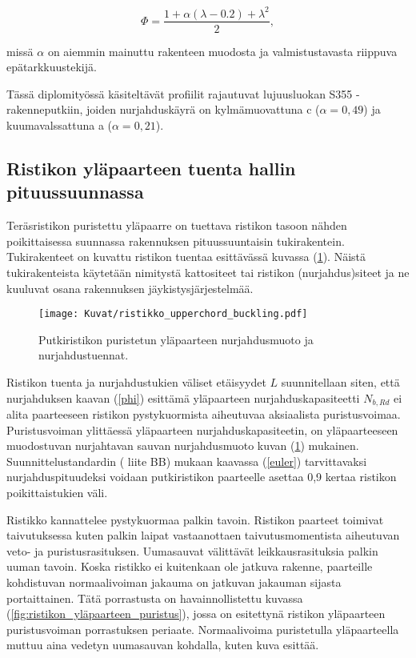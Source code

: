 \documentclass[12pt]{article}
\newenvironment{content}{\pagenumbering{arabic}}{}
\begin{document}
\begin{content}
\begin{equation}
\label{phi}
\Phi = \frac{1+\alpha (\lambda-0.2)+\lambda^2}{2},
\end{equation}   

missä $\alpha$ on aiemmin mainuttu rakenteen muodosta ja valmistustavasta riippuva epätarkkuustekijä. 

Tässä diplomityössä käsiteltävät profiilit rajautuvat lujuusluokan S355 -rakenneputkiin, joiden nurjahduskäyrä on kylmämuovattuna c ($\alpha = 0,49$) ja kuumavalssattuna a ($\alpha = 0,21$).  



\subsection{Ristikon yläpaarteen tuenta hallin pituussuunnassa}

Teräsristikon puristettu yläpaarre on tuettava ristikon tasoon nähden poikittaisessa suunnassa rakennuksen pituussuuntaisin tukirakentein. Tukirakenteet on kuvattu ristikon tuentaa esittävässä kuvassa (\ref{fig:ristikon_nurjahdus}). Näistä tukirakenteista käytetään nimitystä kattositeet tai ristikon (nurjahdus)siteet ja ne kuuluvat osana rakennuksen jäykistysjärjestelmää.  \parencite{try_kaitila}
 
\begin{figure}[htb]

\texttt{[image: Kuvat/ristikko\_upperchord\_buckling.pdf]}
\caption{Putkiristikon puristetun yläpaarteen nurjahdusmuoto ja nurjahdustuennat.}
\label{fig:ristikon_nurjahdus}
\end{figure}

Ristikon tuenta ja nurjahdustukien väliset etäisyydet $L$ suunnitellaan siten, että nurjahduksen kaavan (\ref{phi}) esittämä yläpaarteen nurjahduskapasiteetti $N_{b,Rd}$ ei alita paarteeseen ristikon pystykuormista aiheutuvaa aksiaalista puristusvoimaa. Puristusvoiman ylittäessä yläpaarteen nurjahduskapasiteetin, on yläpaarteeseen muodostuvan nurjahtavan sauvan nurjahdusmuoto kuvan (\ref{fig:ristikon_nurjahdus}) mukainen. Suunnittelustandardin (\citeauthor{en1993} liite BB) mukaan kaavassa (\ref{euler}) tarvittavaksi nurjahduspituudeksi voidaan putkiristikon paarteelle asettaa 0,9 kertaa ristikon poikittaistukien väli.

Ristikko kannattelee pystykuormaa palkin tavoin. Ristikon paarteet toimivat taivutuksessa kuten palkin laipat vastaanottaen taivutusmomentista aiheutuvan veto- ja puristusrasituksen. Uumasauvat välittävät leikkausrasituksia palkin uuman tavoin. Koska ristikko ei kuitenkaan ole jatkuva rakenne, paarteille kohdistuvan normaalivoiman jakauma on jatkuvan jakauman sijasta portaittainen. Tätä porrastusta on havainnollistettu kuvassa (\ref{fig:ristikon_yläpaarteen_puristus}), jossa on esitettynä ristikon yläpaarteen puristusvoiman porrastuksen periaate. Normaalivoima puristetulla yläpaarteella muttuu aina vedetyn uumasauvan kohdalla, kuten kuva esittää. 


\end{content}
\end{document}
